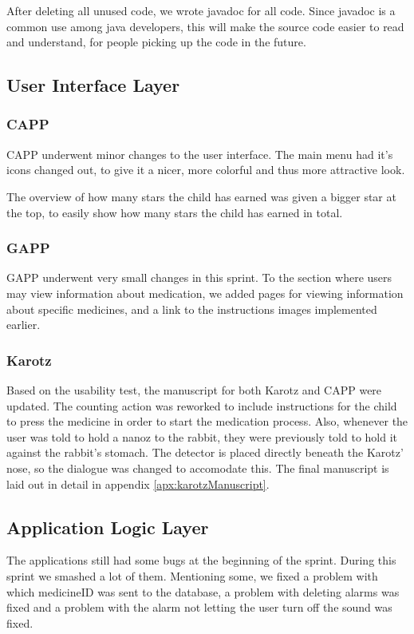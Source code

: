 After deleting all unused code, we wrote javadoc\cite{javadoc} for all code. Since javadoc is a common use among java developers, this will make the source code easier to read and understand, for people picking up the code in the future. 

\subsection{User Interface Layer}
\subsubsection{CAPP}
CAPP underwent minor changes to the user interface. The main menu had it's icons changed out, to give it a nicer, more colorful and thus more attractive look. 

The overview of how many stars the child has earned was given a bigger star at the top, to easily show how many stars the child has earned in total. 

\subsubsection{GAPP}
GAPP underwent very small changes in this sprint. To the section where users may view information about medication, we added pages for viewing information about specific medicines, and a link to the instructions images implemented earlier. 

\subsubsection{Karotz}
Based on the usability test, the manuscript for both Karotz and CAPP were updated. The counting action was reworked to include instructions for the child to press
the medicine in order to start the medication process. Also, whenever the user was told to hold a nanoz to the rabbit, they were previously told to hold it against the
rabbit's stomach. The detector is placed directly beneath the Karotz' nose, so the dialogue was changed to accomodate this. The final manuscript is laid out in detail in appendix \ref{apx:karotzManuscript}.

\subsection{Application Logic Layer}
The applications still had some bugs at the beginning of the sprint. During this sprint we smashed a lot of them. Mentioning some, we fixed a problem with which medicineID was sent to the database, a problem with deleting alarms was fixed and a problem with the alarm not letting the user turn off the sound was fixed. 


